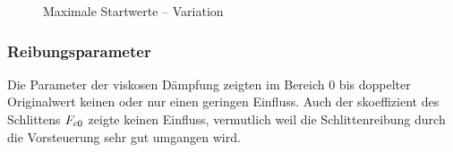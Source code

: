 \begin{figure}[h]
	\caption{Maximale Startwerte -- Variation \Mceo}
	\label{fig:sysvarMc10}
\end{figure}

\subsubsection{Reibungsparameter}

Die Parameter der viskosen Dämpfung zeigten im Bereich 0 bis doppelter Originalwert keinen oder nur einen geringen Einfluss.
Auch der \crb skoeffizient des Schlittens $F_{c0}$ zeigte keinen Einfluss, vermutlich weil die Schlittenreibung durch die Vorsteuerung sehr gut umgangen wird.



